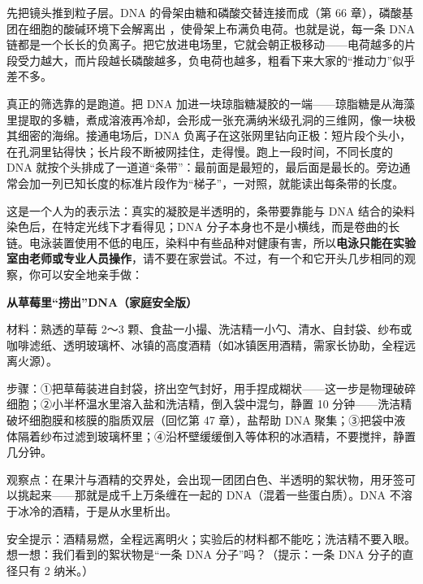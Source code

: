 先把镜头推到粒子层。DNA 的骨架由糖和磷酸交替连接而成（第 66 章），磷酸基团在细胞的酸碱环境下会解离出 ，使骨架上布满负电荷。也就是说，每一条 DNA 链都是一个长长的负离子。把它放进电场里，它就会朝正极移动——电荷越多的片段受力越大，而片段越长磷酸越多，负电荷也越多，粗看下来大家的“推动力”似乎差不多。

真正的筛选靠的是跑道。把 DNA 加进一块琼脂糖凝胶的一端——琼脂糖是从海藻里提取的多糖，煮成溶液再冷却，会形成一张充满纳米级孔洞的三维网，像一块极其细密的海绵。接通电场后，DNA 负离子在这张网里钻向正极：短片段个头小，在孔洞里钻得快；长片段不断被网挂住，走得慢。跑上一段时间，不同长度的 DNA 就按个头排成了一道道“条带”：最前面是最短的，最后面是最长的。旁边通常会加一列已知长度的标准片段作为“梯子”，一对照，就能读出每条带的长度。

\begin{center}
\end{center}

这是一个人为的表示法：真实的凝胶是半透明的，条带要靠能与 DNA 结合的染料染色后，在特定光线下才看得见；DNA 分子本身也不是小横线，而是卷曲的长链。电泳装置使用不低的电压，染料中有些品种对健康有害，所以\textbf{电泳只能在实验室由老师或专业人员操作}，请不要在家尝试。不过，有一个和它开头几步相同的观察，你可以安全地亲手做：

\begin{shiyan}
\textbf{从草莓里“捞出”DNA（家庭安全版）}

材料：熟透的草莓 2～3 颗、食盐一小撮、洗洁精一小勺、清水、自封袋、纱布或咖啡滤纸、透明玻璃杯、冰镇的高度酒精（如冰镇医用酒精，需家长协助，全程远离火源）。

步骤：①把草莓装进自封袋，挤出空气封好，用手捏成糊状——这一步是物理破碎细胞；②小半杯温水里溶入盐和洗洁精，倒入袋中混匀，静置 10 分钟——洗洁精破坏细胞膜和核膜的脂质双层（回忆第 47 章），盐帮助 DNA 聚集；③把袋中液体隔着纱布过滤到玻璃杯里；④沿杯壁缓缓倒入等体积的冰酒精，不要搅拌，静置几分钟。

观察点：在果汁与酒精的交界处，会出现一团团白色、半透明的絮状物，用牙签可以挑起来——那就是成千上万条缠在一起的 DNA（混着一些蛋白质）。DNA 不溶于冰冷的酒精，于是从水里析出。

安全提示：酒精易燃，全程远离明火；实验后的材料都不能吃；洗洁精不要入眼。想一想：我们看到的絮状物是“一条 DNA 分子”吗？（提示：一条 DNA 分子的直径只有 2 纳米。）
\end{shiyan}

